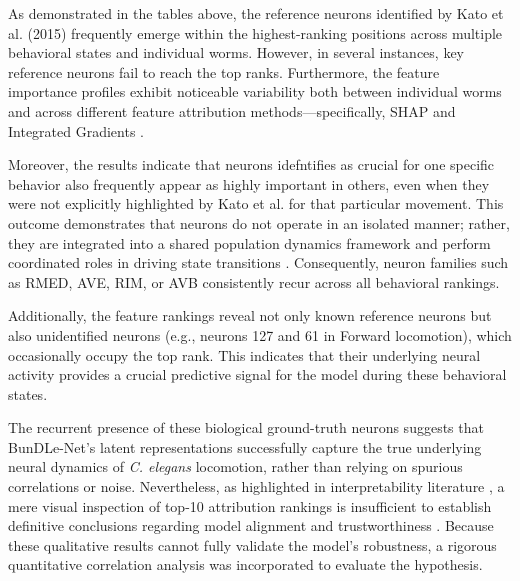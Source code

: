 \documentclass{article}
\begin{document}
As demonstrated in the tables above, the reference neurons identified by Kato et al. (2015) \cite{kato2015global} frequently emerge within the highest-ranking positions across multiple behavioral states and individual worms. However, in several instances, key reference neurons fail to reach the top ranks. Furthermore, the feature importance profiles exhibit noticeable variability both between individual worms and across different feature attribution methods—specifically, SHAP \cite{lundberg2017unified} and Integrated Gradients \cite{sundararajan2017axiomatic}.

Moreover, the results indicate that neurons idefntifies as crucial for one specific behavior also frequently appear as highly important in others, even when they were not explicitly highlighted by Kato et al. for that particular movement. This outcome demonstrates that neurons do not operate in an isolated manner; rather, they are integrated into a shared population dynamics framework and perform coordinated roles in driving state transitions \cite{vyas2020computation}. Consequently, neuron families such as RMED, AVE, RIM, or AVB consistently recur across all behavioral rankings.

Additionally, the feature rankings reveal not only known reference neurons but also unidentified neurons (e.g., neurons 127 and 61 in Forward locomotion), which occasionally occupy the top rank. This indicates that their underlying neural activity provides a crucial predictive signal for the model during these behavioral states.

The recurrent presence of these biological ground-truth neurons suggests
that BunDLe-Net's latent representations successfully capture the true 
underlying neural dynamics of \textit{C. elegans} locomotion, rather than
relying on spurious correlations or noise. Nevertheless, as highlighted
in interpretability literature \cite{lipton2018mythos}, a mere visual inspection of top-10 attribution rankings
 is insufficient to establish definitive conclusions regarding model alignment and trustworthiness \cite{mathis2026joint}.
Because these qualitative results cannot fully validate the model's robustness,
a rigorous quantitative correlation analysis was incorporated to evaluate the hypothesis.
\end{document}
